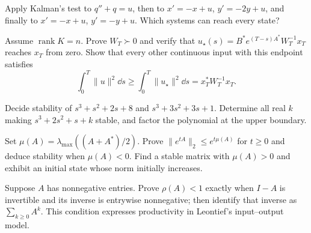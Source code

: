 \begin{exercise}[$\star$]\label{linear:ex:kalmanosc}
Apply Kalman's test to $q''+q=u$, then to $x'=-x+u$, $y'=-2y+u$, and finally to $x'=-x+u$, $y'=-y+u$. Which systems can reach every state?
\end{exercise}
\begin{exercise}[$\star\star$]\label{linear:ex:mininput}
Assume $\operatorname{rank}K=n$. Prove $W_T\succ0$ and verify that $u_\star(s)=B^*e^{(T-s)A^*}W_T^{-1}x_T$ reaches $x_T$ from zero. Show that every other continuous input with this endpoint satisfies
\[\int_0^T\|u\|^2\dd s\ge\int_0^T\|u_\star\|^2\dd s=x_T^*W_T^{-1}x_T.
\]
\end{exercise}
\begin{exercise}[$\star$]\label{linear:ex:routh}
Decide stability of $s^3+s^2+2s+8$ and $s^3+3s^2+3s+1$. Determine all real $k$ making $s^3+2s^2+s+k$ stable, and factor the polynomial at the upper boundary.
\end{exercise}
\begin{exercise}[$\star\star$]\label{linear:ex:lognorm}
Set $\mu(A)=\lambda_{\max}((A+A^*)/2)$. Prove $\|e^{tA}\|_2\le e^{t\mu(A)}$ for $t\ge0$ and deduce stability when $\mu(A)<0$. Find a stable matrix with $\mu(A)>0$ and exhibit an initial state whose norm initially increases.
\end{exercise}
\begin{exercise}[$\star\star\star$]\label{linear:ex:leontief}
Suppose $A$ has nonnegative entries. Prove $\rho(A)<1$ exactly when $I-A$ is invertible and its inverse is entrywise nonnegative; then identify that inverse as $\sum_{k\ge0}A^k$. This condition expresses productivity in Leontief's input--output model.
\end{exercise}

